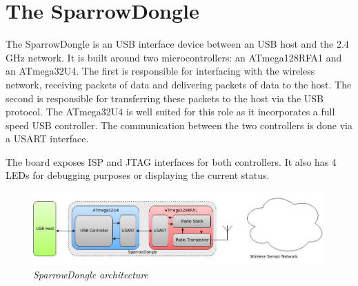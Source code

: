 \section{The SparrowDongle}

The SparrowDongle is an USB interface device between an USB host and the 2.4 GHz
network. It is built around two microcontrollers: an ATmega128RFA1 and an
ATmega32U4. The first is responsible for interfacing with the wireless network,
receiving packets of data and delivering packets of data to the host. The
second is responsible for transferring these packets to the host via the USB
protocol. The ATmega32U4 is well suited for this role as it incorporates a full
speed USB controller. The communication between the two controllers is done via
a USART interface.

The board exposes ISP and JTAG interfaces for both controllers. It also has 4
LEDs for debugging purposes or displaying the current status.

\begin{figure}[ht]
	\begin{center}
		\includegraphics[width=\textwidth]{img/sparrowdongle.jpg}
	\end{center}
	\caption{\small \itshape{SparrowDongle architecture}}
\end{figure}

